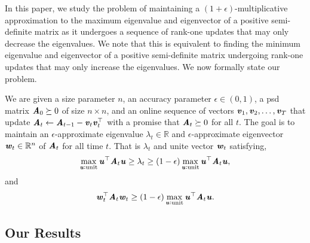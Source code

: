 In this paper, we study the problem of maintaining a $(1+\epsilon)$-multiplicative approximation to the maximum eigenvalue and eigenvector of a positive semi-definite matrix as it undergoes a sequence of rank-one updates that may only decrease the eigenvalues. We note that this is equivalent to finding the minimum eigenvalue and eigenvector of a positive semi-definite matrix undergoing rank-one updates that may only increase the eigenvalues.
%
We now formally state our problem.
\begin{problem}
	\label{prob:dyn}We are given a size parameter $n$, an accuracy parameter $\epsilon\in(0,1)$, a psd matrix $\AA_{0}\succeq0$ of size $n\times n$, and an online sequence of vectors $\vv_{1},\vv_{2},\dots,\vv_{T}$ that update $\AA_{t}\gets \AA_{t-1}-\vv_{t}\vv_{t}^{\top}$ with a promise that $\AA_{t}\succeq0$ for all $t$. 
	The goal is to maintain an $\epsilon$-approximate eigenvalue $\lambda_{t}\in\mathbb{R}$ and $\epsilon$-approximate eigenvector $\ww_{t}\in\mathbb{R}^{n}$ of $\AA_{t}$ for all time $t$. That is $\lambda_t$ and unite vector $\ww_t$ satisfying,
	\begin{equation}\label{eq:epsEigvalue}
	\max_{\uu:\textrm{unit}}\uu^{\top}\AA_{t}\uu \ge \lambda_{t} \ge (1-\epsilon)\max_{\uu:\textrm{unit}}\uu^{\top}\AA_{t}\uu,
	\end{equation}
	and
	\begin{equation}\label{eq:epsEigvec}
	\ww_{t}^{\top}\AA_{t}\ww_{t}\ge(1-\epsilon)\max_{\uu:\textrm{unit}}\uu^{\top}\AA_{t}\uu.
	\end{equation}
\end{problem}



\subsection{Our Results}

